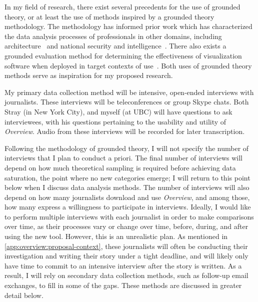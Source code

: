 In my field of research, there exist several precedents for the use of grounded theory, or at least the use of methods inspired by a grounded theory methodology. 
The methodology has informed prior work which has characterized the data analysis processes of professionals in other domains, including architecture~\cite{Tory2008} and national security and intelligence~\cite{Kang2011}. 
There also exists a grounded evaluation method for determining the effectiveness of visualization software when deployed in target contexts of use~\cite{Isenberg2008}. 
Both uses of grounded theory methods serve as inspiration for my proposed research.

My primary data collection method will be intensive, open-ended interviews with journalists. 
These interviews will be teleconferences or group Skype chats. 
Both Stray (in New York City), and myself (at UBC) will have questions to ask interviewees, with his questions pertaining to the usability and utility of {\it Overview}. 
Audio from these interviews will be recorded for later transcription.

Following the methodology of grounded theory, I will not specify the number of interviews that I plan to conduct a priori. 
The final number of interviews will depend on how much theoretical sampling is required before achieving data saturation, the point where no new categories emerge; I will return to this point below when I discuss data analysis methods. 
The number of interviews will also depend on how many journalists download and use {\it Overview}, and among those, how many express a willingness to participate in interviews. 
Ideally, I would like to perform multiple interviews with each journalist in order to make comparisons over time, as their processes vary or change over time, before, during, and after using the new tool. 
However, this is an unrealistic plan. 
As mentioned in \autoref{app:overview:proposal-context}, these journalists will often be conducting their investigation and writing their story under a tight deadline, and will likely only have time to commit to an intensive interview after the story is written. 
As a result, I will rely on secondary data collection methods, such as follow-up email exchanges, to fill in some of the gaps. 
These methods are discussed in greater detail below.

